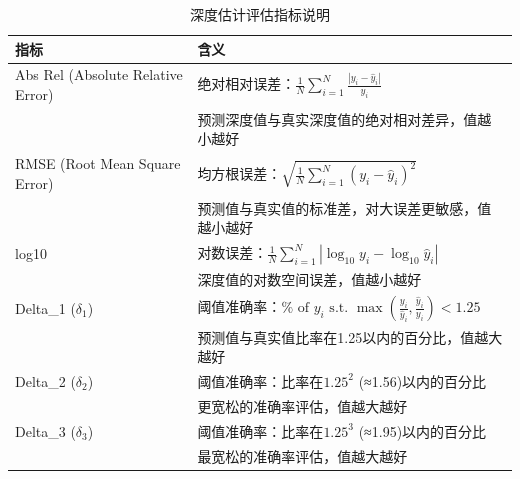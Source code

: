 \documentclass{article}
\begin{document}
\begin{table}[h!]
    \centering
    \label{tab:metrics_explanation}
    \begin{tabular}{lp{8cm}}
        \toprule
        \textbf{指标} & \textbf{含义} \\
        \midrule
        Abs Rel (Absolute Relative Error) & 绝对相对误差：$\frac{1}{N}\sum_{i=1}^N \frac{|y_i - \hat{y}_i|}{y_i}$ \\
        & 预测深度值与真实深度值的绝对相对差异，值越小越好 \\[0.5em]
        
        RMSE (Root Mean Square Error) & 均方根误差：$\sqrt{\frac{1}{N}\sum_{i=1}^N (y_i - \hat{y}_i)^2}$ \\
        & 预测值与真实值的标准差，对大误差更敏感，值越小越好 \\[0.5em]
        
        log10 & 对数误差：$\frac{1}{N}\sum_{i=1}^N |\log_{10} y_i - \log_{10} \hat{y}_i|$ \\
        & 深度值的对数空间误差，值越小越好 \\[0.5em]
        
        Delta_1 ($\delta_1$) & 阈值准确率：$\% \text{ of } y_i \text{ s.t. } \max\left(\frac{y_i}{\hat{y}_i}, \frac{\hat{y}_i}{y_i}\right) < 1.25$ \\
        & 预测值与真实值比率在1.25以内的百分比，值越大越好 \\[0.5em]
        
        Delta\_2 ($\delta_2$) & 阈值准确率：比率在$1.25^2$ (≈1.56)以内的百分比 \\
        & 更宽松的准确率评估，值越大越好 \\[0.5em]
        
        Delta\_3 ($\delta_3$) & 阈值准确率：比率在$1.25^3$ (≈1.95)以内的百分比 \\
        & 最宽松的准确率评估，值越大越好 \\
        \bottomrule
    \end{tabular}
    \caption{深度估计评估指标说明}
\end{table}

\newpage
\end{document}
